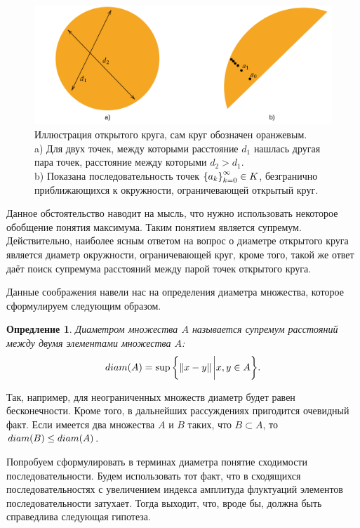 \documentclass[12pt]{article}
\newtheorem{definition}{Опредление}[section]
\begin{document}
\begin{figure}[ht]
    \centering
    \includegraphics[width = 1\textwidth]{fig6.png}
    \caption{Иллюстрация открытого круга, сам круг обозначен оранжевым.\\ a) Для двух точек, между которыми расстояние $d_1$ нашлась другая пара точек, расстояние между которыми $d_2 > d_1$.\\ b) Показана последовательность точек $\qty{a_k}_{k=0}^{\infty} \in K$, безгранично приближающихся к окружности, ограничевающей открытый круг.}
    \label{fig:6}
\end{figure}
\par
Данное обстоятельство наводит на мысль, что нужно использовать некоторое обобщение понятия максимума. Таким понятием является супремум. Действительно, наиболее ясным ответом на вопрос о диаметре открытого круга является диаметр окружности, ограничевающей круг, кроме того, такой же ответ даёт поиск супремума расстояний между парой точек открытого круга.
\par
Данные соображения навели нас на определения диаметра множества, которое сформулируем следующим образом.
\begin{definition}
Диаметром множества $A$ называется супремум расстояний между двумя элементами множества $A$:
\begin{equation}
    diam\qty(A) = \sup\qty{\norm{x-y}\eval x,y\in A}.
\end{equation}
\end{definition}
Так, например, для неограниченных множеств диаметр будет равен бесконечности. Кроме того, в дальнейших рассуждениях пригодится очевидный факт. Если имеется два множества $A$ и $B$ таких, что $B \subset A$, то $diam\qty(B) \le diam\qty(A)$.
\par
Попробуем сформулировать в терминах диаметра понятие сходимости последовательности. Будем использовать тот факт, что в сходящихся последовательностях с увеличением индекса амплитуда флуктуаций элементов последовательности затухает. Тогда выходит, что, вроде бы, должна быть справедлива следующая гипотеза.
\end{document}
